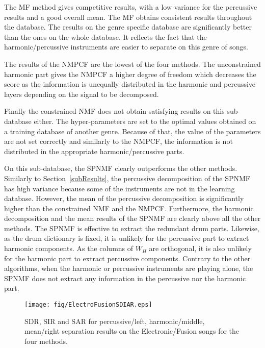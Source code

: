 The MF method gives competitive results, with a low variance for the percussive results and a good overall mean. The MF obtains consistent results throughout the database. The results on the genre specific database are significantly better than the ones on the whole database. It reflects the fact that the harmonic/percussive instruments are easier to separate on this genre of songs. 
 
The results of the NMPCF are the lowest of the four methods. The unconstrained harmonic part gives the NMPCF a higher degree of freedom which decreases the score as the information is unequally distributed in the harmonic and percussive layers depending on the signal to be decomposed. 

Finally the constrained NMF does not obtain satisfying results on this sub-database either. The hyper-parameters are set to the optimal values obtained on a training database of another genre. Because of that, the value of the parameters are not set correctly and similarly to the NMPCF, the information is not distributed in the appropriate harmonic/percussive parts. 


On this sub-database, the SPNMF clearly outperforms the other methods. Similarly to Section~\ref{subResults}, the percussive decomposition of the SPNMF has high variance because some of the instruments are not in the learning database. However, the mean of the percussive decomposition is significantly higher than the constrained NMF and the NMPCF. Furthermore, the harmonic decomposition and the mean results of the SPNMF are clearly above all the other methods. The SPNMF is effective to extract the redundant drum parts. Likewise, as the drum dictionary is fixed, it is unlikely for the percussive part to extract harmonic components. As the columns of $W_{H}$ are orthogonal, it is also unlikely for the harmonic part to extract percussive components. Contrary to the other algorithms, when the harmonic or percussive instruments are playing alone, the SPNMF does not extract any information in the percussive nor the harmonic part.



\begin{figure*}[t]

  \centering 
  \texttt{[image: fig/ElectroFusionSDIAR.eps]}
  \caption{\label{ElectroFusionSDR} SDR, SIR and SAR for percussive/left, harmonic/middle, mean/right separation results on the Electronic/Fusion songs for the four methods.}
  
\end{figure*}

